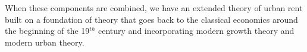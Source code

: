 When these components are  combined,  we have an extended theory of urban rent built on a foundation of theory that goes back to the \gls{classical economics} around the beginning of the 19$^{th}$ century and incorporating modern growth theory and modern urban theory.




%
 








